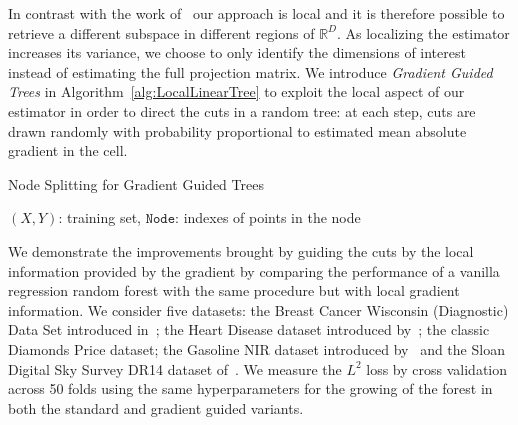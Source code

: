 In contrast with the work of~\cite{dalalyanNewAlgorithmEstimating2008} our approach is local and it is therefore possible to retrieve a different subspace in different regions of $\mathbb{R}^D$. As localizing the estimator increases its variance, we choose to only identify the dimensions of interest instead of estimating the full projection matrix.
We introduce \emph{Gradient Guided Trees} in Algorithm~\ref{alg:LocalLinearTree} to exploit the local aspect of our estimator in order to direct the cuts in a random tree: at each step, cuts are drawn randomly with probability proportional to estimated mean absolute gradient in the cell.
\begin{algorithm}
    \caption{Node Splitting for Gradient Guided Trees}\label{alg:LocalLinearTree}
    \begin{algorithmic}[1] %
        \Require $(X, Y)$: training set, $\texttt{Node}$: indexes of points in the node
    \end{algorithmic}
\end{algorithm}
We demonstrate the improvements brought by guiding the cuts by the local information provided by the gradient by comparing the performance of a vanilla regression random forest with the same procedure but with local gradient information. 
We consider five datasets: the Breast Cancer Wisconsin (Diagnostic) Data Set introduced in~\cite{streetNuclearFeatureExtraction1993}; the Heart Disease dataset introduced by~\cite{detranoInternationalApplicationNew1989}; the classic Diamonds Price dataset; the Gasoline NIR dataset introduced by~\cite{kalivasTwoDataSets1997} and the Sloan Digital Sky Survey DR14 dataset of~\cite{abolfathiFourteenthDataRelease2018}. We measure the $L^2$ loss by cross validation across 50 folds using the same hyperparameters for the growing of the forest in both the standard and gradient guided variants.

